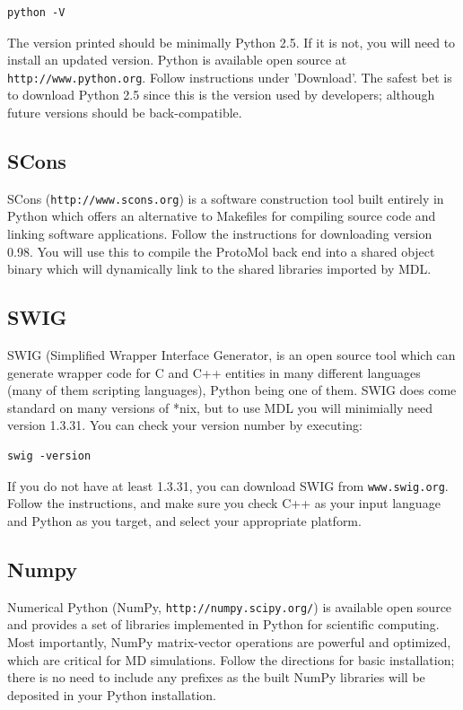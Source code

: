 \documentclass[11pt]{report}
\begin{document}
\begin{verbatim}
python -V
\end{verbatim}

The version printed should be minimally Python 2.5.  If it is not,
you will need to install an updated version.  Python is available
open source at \texttt{http://www.python.org}.  Follow instructions
under 'Download'.  The safest bet is to download Python 2.5 since
this is the version used by developers; although future versions
should be back-compatible.

\subsection{SCons}

SCons (\texttt{http://www.scons.org}) is a software construction
tool built entirely in Python which offers an alternative to Makefiles
for compiling source code and linking software applications.  Follow
the instructions for downloading version 0.98.  
You will use this to compile the ProtoMol back end into a shared 
object binary which will dynamically link to the shared libraries 
imported by MDL.

\subsection{SWIG}

SWIG (Simplified Wrapper Interface Generator, \cite{Beaz96} is an
open source tool which can generate wrapper code for C and C++
entities in many different languages (many of them scripting
languages), Python being one of them.  SWIG does come standard
on many versions of *nix, but to use MDL you will minimially
need version 1.3.31.  You can check your version number by
executing:

\begin{verbatim}
swig -version
\end{verbatim}

If you do not have at least 1.3.31, you can download SWIG
from \texttt{www.swig.org}.  Follow the instructions, and make
sure you check C++ as your input language and Python as you target,
and select your appropriate platform.

\subsection{Numpy}

Numerical Python (NumPy, \texttt{http://numpy.scipy.org/}) is
available open source and provides a set of libraries implemented
in Python for scientific computing.  Most importantly, NumPy
matrix-vector operations are powerful and optimized, which
are critical for MD simulations.  Follow the directions for
basic installation; there is no need to include any prefixes as
the built NumPy libraries will be deposited in your Python
installation.
\end{document}
